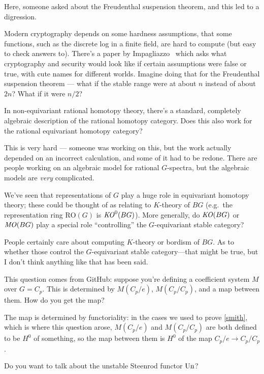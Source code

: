 Here, someone asked about the Freudenthal suspension theorem, and this led to a digression.
\begin{rem}
Modern cryptography depends on some hardness assumptions, that some functions, such as the discrete log in a finite
field, are hard to compute (but easy to check answers to). There's a paper by Impagliazzo~\cite{Impagliazzo} which
asks what cryptography and security would look like if certain assumptions were false or true, with cute names for
different worlds. Imagine doing that for the Freudenthal suspension theorem --- what if the stable range were at
about $n$ instead of about $2n$? What if it were $n/2$?
\end{rem}
\begin{ques}
In non-equivariant rational homotopy theory, there's a standard, completely algebraic description of the rational
homotopy category. Does this also work for the rational equivariant homotopy category?
\end{ques}
This is very hard --- someone was working on this, but the work actually depended on an incorrect calculation, and
some of it had to be redone. There are people working on an algebraic model for rational $G$-spectra, but the
algebraic models are \emph{very} complicated.
\begin{ques}
We've seen that representations of $G$ play a huge role in equivariant homotopy theory; these could be thought of
as relating to $K$-theory of $BG$ (e.g.\ the representation ring $\mathrm{RO}(G)$ is $\mathit{KO}^0(BG)$). More generally,
do $\mathit{KO}(BG)$ or $\mathit{MO}(BG)$ play a special role ``controlling'' the $G$-equivariant stable category?
\end{ques}
People certainly care about computing $K$-theory or bordism of $BG$. As to whether those control the $G$-equivariant stable category---that might be true, but I don't think anything like that has been said.
\begin{ques}
This question comes from GitHub: suppose you're defining a coefficient system $M$ over $G = C_p$. This is
determined by $M(C_p/e)$, $M(C_p/C_p)$, and a map between them. How do you get the map?
\end{ques}
The map is determined by functoriality: in the cases we used to prove \cref{smith}, which is where this question
arose, $M(C_p/e)$ and $M(C_p/C_p)$ are both defined to be $H^0$ of something, so the map between them is $H^0$ of
the map $C_p/e\to C_p/C_p$.
\begin{ques}
Do you want to talk about the unstable Steenrod functor $\operatorname{Un}$?
\end{ques}

